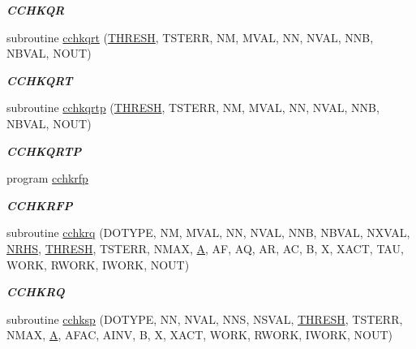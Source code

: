 \begin{DoxyCompactItemize}
\begin{DoxyCompactList}\small\item\em {\bfseries C\+C\+H\+K\+Q\+R} \end{DoxyCompactList}\item 
subroutine \hyperlink{group__complex__lin_ga6d3f2f7ac637b13cf1f2c70a901e7489}{cchkqrt} (\hyperlink{zlaqgs_8c_a0656018abfc9fa2821827415f5d5ea57}{T\+H\+R\+E\+S\+H}, T\+S\+T\+E\+R\+R, N\+M, M\+V\+A\+L, N\+N, N\+V\+A\+L, N\+N\+B, N\+B\+V\+A\+L, N\+O\+U\+T)
\begin{DoxyCompactList}\small\item\em {\bfseries C\+C\+H\+K\+Q\+R\+T} \end{DoxyCompactList}\item 
subroutine \hyperlink{group__complex__lin_ga498fa8447df6ed398ad87c4ab64c340b}{cchkqrtp} (\hyperlink{zlaqgs_8c_a0656018abfc9fa2821827415f5d5ea57}{T\+H\+R\+E\+S\+H}, T\+S\+T\+E\+R\+R, N\+M, M\+V\+A\+L, N\+N, N\+V\+A\+L, N\+N\+B, N\+B\+V\+A\+L, N\+O\+U\+T)
\begin{DoxyCompactList}\small\item\em {\bfseries C\+C\+H\+K\+Q\+R\+T\+P} \end{DoxyCompactList}\item 
program \hyperlink{group__complex__lin_ga6acbc6e5de1f0ea2cf3e6a2ba6b42691}{cchkrfp}
\begin{DoxyCompactList}\small\item\em {\bfseries C\+C\+H\+K\+R\+F\+P} \end{DoxyCompactList}\item 
subroutine \hyperlink{group__complex__lin_ga4d5d048f134b6f378e5d1e8e7f174a3c}{cchkrq} (D\+O\+T\+Y\+P\+E, N\+M, M\+V\+A\+L, N\+N, N\+V\+A\+L, N\+N\+B, N\+B\+V\+A\+L, N\+X\+V\+A\+L, \hyperlink{example__user_8c_aa0138da002ce2a90360df2f521eb3198}{N\+R\+H\+S}, \hyperlink{zlaqgs_8c_a0656018abfc9fa2821827415f5d5ea57}{T\+H\+R\+E\+S\+H}, T\+S\+T\+E\+R\+R, N\+M\+A\+X, \hyperlink{classA}{A}, A\+F, A\+Q, A\+R, A\+C, B, X, X\+A\+C\+T, T\+A\+U, W\+O\+R\+K, R\+W\+O\+R\+K, I\+W\+O\+R\+K, N\+O\+U\+T)
\begin{DoxyCompactList}\small\item\em {\bfseries C\+C\+H\+K\+R\+Q} \end{DoxyCompactList}\item 
subroutine \hyperlink{group__complex__lin_gae70038106a6ed73e487198570d4b9485}{cchksp} (D\+O\+T\+Y\+P\+E, N\+N, N\+V\+A\+L, N\+N\+S, N\+S\+V\+A\+L, \hyperlink{zlaqgs_8c_a0656018abfc9fa2821827415f5d5ea57}{T\+H\+R\+E\+S\+H}, T\+S\+T\+E\+R\+R, N\+M\+A\+X, \hyperlink{classA}{A}, A\+F\+A\+C, A\+I\+N\+V, B, X, X\+A\+C\+T, W\+O\+R\+K, R\+W\+O\+R\+K, I\+W\+O\+R\+K, N\+O\+U\+T)

\end{DoxyCompactItemize}
